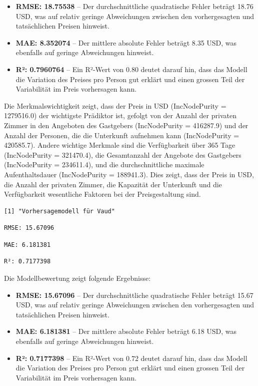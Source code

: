 \documentclass[
  journal,
]{IEEEtran}%
\begin{document}
\begin{itemize}
\item
  \textbf{RMSE: 18.75538} -- Der durchschnittliche quadratische Fehler
  beträgt 18.76 USD, was auf relativ geringe Abweichungen zwischen den
  vorhergesagten und tatsächlichen Preisen hinweist.
\item
  \textbf{MAE: 8.352074} -- Der mittlere absolute Fehler beträgt 8.35
  USD, was ebenfalls auf geringe Abweichungen hinweist.
\item
  \textbf{R²: 0.7960764} -- Ein R²-Wert von 0.80 deutet darauf hin, dass
  das Modell die Variation des Preises pro Person gut erklärt und einen
  grossen Teil der Variabilität im Preis vorhersagen kann.
\end{itemize}

Die Merkmalswichtigkeit zeigt, dass der Preis in USD (IncNodePurity =
1279516.0) der wichtigste Prädiktor ist, gefolgt von der Anzahl der
privaten Zimmer in den Angeboten des Gastgebers (IncNodePurity =
416287.9) und der Anzahl der Personen, die die Unterkunft aufnehmen kann
(IncNodePurity = 420585.7). Andere wichtige Merkmale sind die
Verfügbarkeit über 365 Tage (IncNodePurity = 321470.4), die Gesamtanzahl
der Angebote des Gastgebers (IncNodePurity = 234611.4), und die
durchschnittliche maximale Aufenthaltsdauer (IncNodePurity = 188941.3).
Dies zeigt, dass der Preis in USD, die Anzahl der privaten Zimmer, die
Kapazität der Unterkunft und die Verfügbarkeit wesentliche Faktoren bei
der Preisgestaltung sind.

\begin{verbatim}
[1] "Vorhersagemodell für Vaud"
\end{verbatim}

\begin{verbatim}
RMSE: 15.67096 
\end{verbatim}

\begin{verbatim}
MAE: 6.181381 
\end{verbatim}

\begin{verbatim}
R²: 0.7177398 
\end{verbatim}

Die Modellbewertung zeigt folgende Ergebnisse:

\begin{itemize}
\item
  \textbf{RMSE: 15.67096} -- Der durchschnittliche quadratische Fehler
  beträgt 15.67 USD, was auf relativ geringe Abweichungen zwischen den
  vorhergesagten und tatsächlichen Preisen hinweist.
\item
  \textbf{MAE: 6.181381} -- Der mittlere absolute Fehler beträgt 6.18
  USD, was ebenfalls auf geringe Abweichungen hinweist.
\item
  \textbf{R²: 0.7177398} -- Ein R²-Wert von 0.72 deutet darauf hin, dass
  das Modell die Variation des Preises pro Person gut erklärt und einen
  grossen Teil der Variabilität im Preis vorhersagen kann.
\end{itemize}
\end{document}
